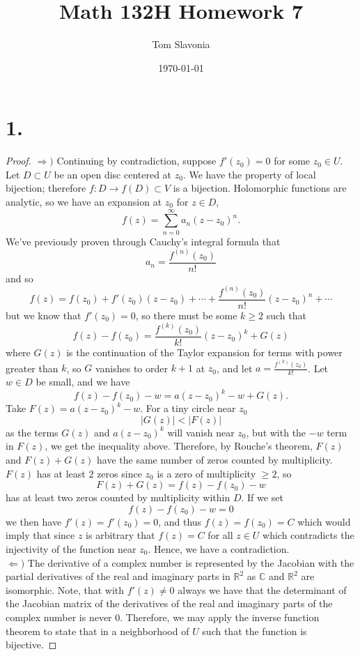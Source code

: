 \documentclass{article}
\title{Math 132H Homework 7}
\author{Tom Slavonia}
\date{\today}
\begin{document}
\maketitle

\section*{1.}
\begin{proof}
  $\Rightarrow)$ Continuing by contradiction, suppose $f'(z_0) = 0$ for some $z_0 \in U$. Let $D \subset U$ be an open disc centered at $z_0$. We have the property of local bijection; therefore $f: D \to f(D) \subset V$ is a bijection. Holomorphic functions are analytic, so we have an expansion at $z_0$ for $z \in D$,
  \[
  f(z) = \sum\limits_{n = 0}^{\infty}a_n(z- z_0)^n. 
  \]
  We've previously proven through Cauchy's integral formula that 
  \[
  a_n = \frac{f^{(n)}(z_0)}{n!}  
  \]
  and so 
  \[
  f(z) = f(z_0) + f'(z_0)(z - z_0) + \cdots + \frac{f^{(n)}(z_0)}{n!}(z - z_0)^n + \cdots  
  \]
  but we know that $f'(z_0) =0$, so there must be some $k \geq 2$ such that 
  \[
  f(z) - f(z_0) = \frac{f^{(k)}(z_0)}{k!}(z - z_0)^k + G(z)  
  \]
  where $G(z)$ is the continuation of the Taylor expansion for terms with power greater than $k$, so $G$ vanishes to order $k + 1$ at $z_0$, and let $a = \frac{f^{(k)}(z_0)}{k!}$. Let $w \in D$ be small, and we have 
  \[
  f(z) - f(z_0) - w = a(z - z_0)^k - w + G(z). 
  \]
  Take $F(z) = a(z - z_0)^k - w$. For a tiny circle near $z_0$ 
  \[
  |G(z)| < |F(z)|  
  \]
  as the terms $G(z)$ and $a(z - z_0)^k$ will vanish near $z_0$, but with the $-w$ term in $F(z)$, we get the inequality above. Therefore, by Rouche's theorem, $F(z)$ and $F(z) + G(z)$ have the same number of zeros counted by multiplicity. $F(z)$ has at least $2$ zeros since $z_0$ is a zero of multiplicity $\geq 2$, so 
  \[
  F(z) + G(z) = f(z) - f(z_0) - w  
  \]
  has at least two zeros counted by multiplicity within $D$. If we set 
  \[
  f(z) - f(z_0) - w = 0  
  \]
  we then have $f'(z) = f'(z_0) = 0$, and thus $f(z) = f(z_0) = C$ which would imply that since $z$ is arbitrary that $f(z) = C$ for all $z \in U$ which contradicts the injectivity of the function near $z_0$. Hence, we have a contradiction. \\ 
  $\Leftarrow)$ The derivative of a complex number is represented by the Jacobian with the partial derivatives of the real and imaginary parts in $\mathbb{R}^2$ as $\mathbb{C}$ and $\mathbb{R}^2$ are isomorphic. Note, that with $f'(z) 
  \neq 0$ always we have that the determinant of the Jacobian matrix of the derivatives of the real and imaginary parts of the complex number is never $0$. Therefore, we may apply the inverse function theorem to state that in a neighborhood of $U$ such that the function is bijective. 
\end{proof}
\end{document}

